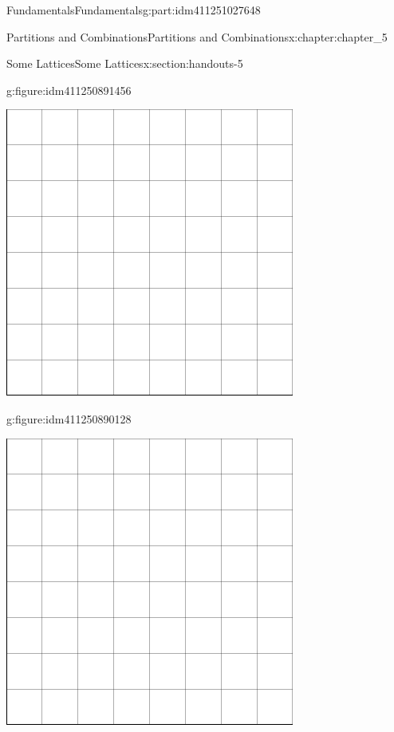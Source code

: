 \documentclass[oneside,10pt,]{book}
\numberwithin{equation}{section}
\begin{document}
\begin{partptx}{Fundamentals}{}{Fundamentals}{}{}{g:part:idm411251027648}
\begin{chapterptx}{Partitions and Combinations}{}{Partitions and Combinations}{}{}{x:chapter:chapter_5}
\begin{sectionptx}{Some Lattices}{}{Some Lattices}{}{}{x:section:handouts-5}
\begin{figureptx}{}{g:figure:idm411250891456}{}
\begin{image}{0.125}{0.75}{0.125}%
\includegraphics[width=\linewidth]{images/graphpaper8.png}
\end{image}%
\tcblower
\end{figureptx}%
\begin{figureptx}{}{g:figure:idm411250890128}{}%
\begin{image}{0.125}{0.75}{0.125}%
\includegraphics[width=\linewidth]{images/graphpaper8.png}

\end{image}
\end{figureptx}
\end{sectionptx}
\end{chapterptx}
\end{partptx}
\end{document}
